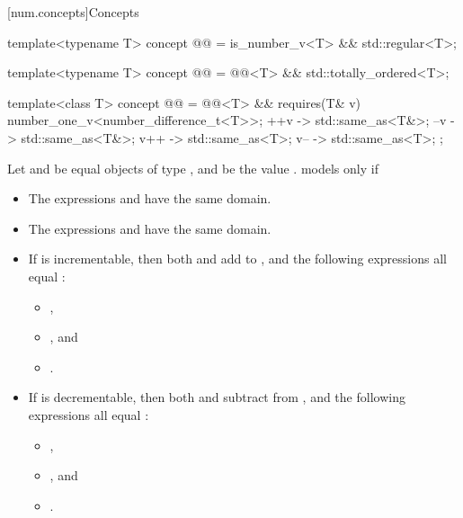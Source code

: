[num.concepts]{Concepts}

\begin{itemdecl}
template<typename T>
concept @@ = is_number_v<T> && std::regular<T>;

template<typename T>
concept @@ = @@<T> && std::totally_ordered<T>;
\end{itemdecl}

\begin{itemdecl}
template<class T>
concept @@ =
  @@<T> &&
  requires(T& v) {
    number_one_v<number_difference_t<T>>;
    { ++v } -> std::same_as<T&>;
    { --v } -> std::same_as<T&>;
    { v++ } -> std::same_as<T>;
    { v-- } -> std::same_as<T>;
  };
\end{itemdecl}

\begin{itemdescr}
\pnum
Let  and  be equal objects of type ,
and  be the value .
 models  only if
\begin{itemize}
\item
The expressions  and  have the same domain.
\item
The expressions  and  have the same domain.
\item
If  is incrementable,
then both  and  add  to ,
and the following expressions all equal :
\begin{itemize}
\item {},
\item {}, and
\item {}.
\end{itemize}
\item
If  is decrementable,
then both  and  subtract  from ,
and the following expressions all equal :
\begin{itemize}
\item {},
\item {}, and
\item {}.
\end{itemize}
\end{itemize}
\end{itemdescr}

